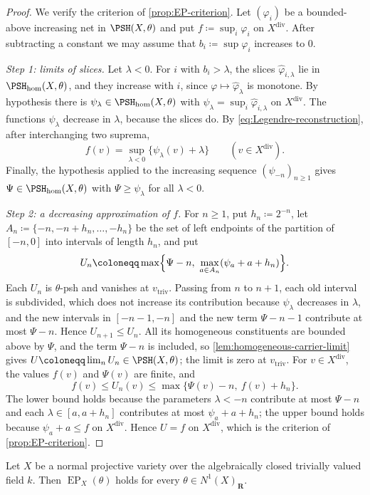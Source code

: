 \documentclass[11pt,a4paper]{article}
\newcommand{\divv}{\mathrm{div}}       %
\newcommand{\vtriv}{v_{\mathrm{triv}}} %
\newcommand{\PSHhom}{\PSH_{\mathrm{hom}}}          %
\newcommand{\EP}{\operatorname{EP}}
\begin{document}
\begin{proof}
We verify the criterion of \cref{prop:EP-criterion}. Let $(\varphi_i)$ be a bounded-above increasing net in $\PSH(X,\theta)$ and put $f\coloneqq\sup_i\varphi_i$ on $X^{\divv}$. After subtracting a constant we may assume that $b_i\coloneqq\sup\varphi_i$ increases to $0$.

\emph{Step 1: limits of slices.} Let $\lambda<0$. For $i$ with $b_i>\lambda$, the slices $\widehat\varphi_{i,\lambda}$ lie in $\PSHhom(X,\theta)$, and they increase with $i$, since $\varphi\mapsto\widehat\varphi_\lambda$ is monotone. By hypothesis there is $\psi_\lambda\in\PSHhom(X,\theta)$ with $\psi_\lambda=\sup_i\widehat\varphi_{i,\lambda}$ on $X^{\divv}$. The functions $\psi_\lambda$ decrease in $\lambda$, because the slices do. By \eqref{eq:Legendre-reconstruction}, after interchanging two suprema,
\[
 f(v)=\sup_{\lambda<0}\{\psi_\lambda(v)+\lambda\}\qquad(v\in X^{\divv}).
\]
Finally, the hypothesis applied to the increasing sequence $(\psi_{-n})_{n\ge1}$ gives $\Psi\in\PSHhom(X,\theta)$ with $\Psi\ge\psi_\lambda$ for all $\lambda<0$.

\emph{Step 2: a decreasing approximation of $f$.} For $n\ge1$, put $h_n\coloneqq2^{-n}$, let $A_n\coloneqq\{-n,-n+h_n,\ldots,-h_n\}$ be the set of left endpoints of the partition of $[-n,0]$ into intervals of length $h_n$, and put
\[
 U_n\coloneqq\max\Bigl\{\Psi-n,\ \max_{a\in A_n}(\psi_a+a+h_n)\Bigr\}.
\]
Each $U_n$ is $\theta$-psh and vanishes at $\vtriv$. Passing from $n$ to $n+1$, each old interval is subdivided, which does not increase its contribution because $\psi_\lambda$ decreases in $\lambda$, and the new intervals in $[-n-1,-n]$ and the new term $\Psi-n-1$ contribute at most $\Psi-n$. Hence $U_{n+1}\le U_n$. All its homogeneous constituents are bounded above by $\Psi$, and the term $\Psi-n$ is included, so \cref{lem:homogeneous-carrier-limit} gives $U\coloneqq\lim_nU_n\in\PSH(X,\theta)$; the limit is zero at $\vtriv$. For $v\in X^{\divv}$, the values $f(v)$ and $\Psi(v)$ are finite, and
\[
 f(v)\leq U_n(v)\leq\max\{\Psi(v)-n,\ f(v)+h_n\}.
\]
The lower bound holds because the parameters $\lambda<-n$ contribute at most $\Psi-n$ and each $\lambda\in[a,a+h_n]$ contributes at most $\psi_a+a+h_n$; the upper bound holds because $\psi_a+a\le f$ on $X^{\divv}$. Hence $U=f$ on $X^{\divv}$, which is the criterion of \cref{prop:EP-criterion}.
\end{proof}

\begin{corollary}\label{cor:normal-EP}
Let $X$ be a normal projective variety over the algebraically closed trivially valued field $k$. Then $\EP_X(\theta)$ holds for every $\theta\in N^1(X)_{\mathbf R}$.
\end{corollary}
\end{document}
